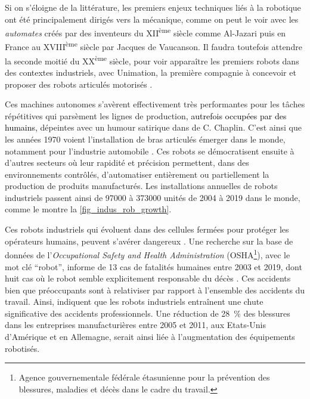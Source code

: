 Si on s'éloigne de la littérature, les premiers enjeux techniques liés à la robotique ont été principalement dirigés vers la mécanique, comme on peut le voir avec les \emph{automates} créés par des inventeurs du XII\textsuperscript{ème} siècle comme Al-Jazari \parencite{ceccarelli_distinguished_2009} puis en France au XVIII\textsuperscript{ème} siècle par Jacques de Vaucanson. Il faudra toutefois attendre la seconde moitié du XX\textsuperscript{ème} siècle, pour voir apparaître les premiers robots dans des contextes industriels, avec Unimation, la première compagnie à concevoir et proposer des robots articulés motorisés \parencite{devol_programmed_1961}.

Ces machines autonomes s'avèrent effectivement très performantes pour les tâches répétitives qui parsèment les lignes de production\textcolor{black}{, autrefois occupées par des humains,} dépeintes avec un humour satirique dans \textcite{modern_times_1936} de C. Chaplin. C'est ainsi que les années 1970 voient l'installation de bras articulés émerger dans le monde, notamment pour l'industrie automobile \parencite{lazaric_origines_1992}. Ces robots se démocratisent ensuite à d'autres secteurs où leur rapidité et précision permettent, dans des environnements contrôlés, d'automatiser entièrement ou partiellement la production de produits manufacturés. Les installations annuelles de robots industriels passent ainsi de \SI{97000}{} à \SI{373000}{} unités de 2004 à 2019 dans le monde, comme le montre la \cref{fig_indus_rob_growth}.

\tikzexternalenable 

\tikzexternaldisable

Ces robots industriels qui évoluent dans des cellules fermées pour protéger les opérateurs humains, peuvent s'avérer dangereux \parencite[Chapitre~4]{dhillon_robot_1991}. Une recherche sur la base de données de l'\textit{Occupational Safety and Health Administration} (OSHA\footnote{Agence gouvernementale fédérale étasunienne pour la prévention des blessures, maladies et décès dans le cadre du travail.}), avec le mot clé \foreignquote{french}{robot}, informe de 13 cas de fatalités humaines entre 2003 et 2019, dont huit cas où le robot semble explicitement responsable du décès \parencite{OSHA_robot_accident}. Ces accidents bien que préoccupants sont à relativiser par rapport à l'ensemble des accidents du travail. Ainsi, \parencite{gihleb_industrial_2020} indiquent que les robots industriels entraînent une chute significative des accidents professionnels. Une réduction de \SI{28}{\percent} des blessures dans les entreprises manufacturières entre 2005 et 2011, aux Etats-Unis d'Amérique et en Allemagne, serait ainsi liée à l'augmentation des équipements robotisés.

